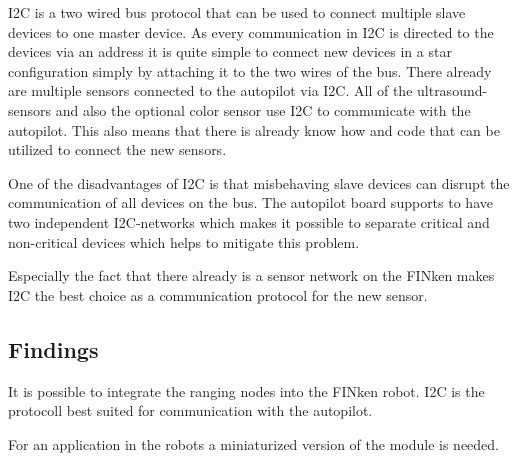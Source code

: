 I2C is a two wired bus protocol that can be used to connect multiple slave devices to one master device.
As every communication in I2C is directed to the devices via an address it is quite simple to connect new devices in a star configuration simply by attaching it to the two wires of the bus.
There already are multiple sensors connected to the autopilot via I2C.
All of the ultrasound-sensors and also the optional color sensor use I2C to communicate with the autopilot.
This also means that there is already know how and code that can be utilized to connect the new sensors.

One of the disadvantages of I2C is that misbehaving slave devices can disrupt the communication of all devices on the bus.
The autopilot board supports to have two independent I2C-networks which makes it possible to separate critical and non-critical devices which helps to mitigate this problem.

Especially the fact that there already is a sensor network on the FINken makes I2C the best choice as a communication protocol for the new sensor.

\subsection{Findings}

It is possible to integrate the ranging nodes into the FINken robot.
I2C is the protocoll best suited for communication with the autopilot.

For an application in the robots a miniaturized version of the module is needed.

